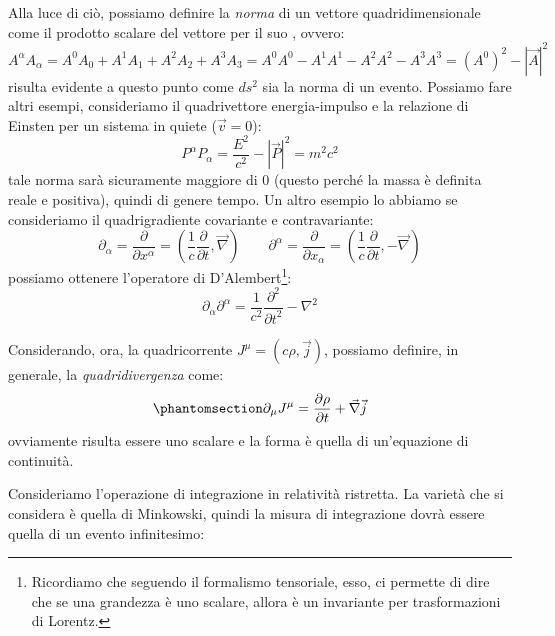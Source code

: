 Alla luce di ciò, possiamo definire la \textit{norma} di un vettore quadridimensionale come il prodotto scalare del vettore per il suo , ovvero:  
\begin{equation*}
A^{\alpha}A_{\alpha}=A^0A_0+A^1A_1+A^2A_2+A^3A_3=A^0A^0-A^1A^1-A^2A^2-A^3A^3=(A^0)^2-|\vec{A}|^2
\end{equation*}
risulta evidente a questo punto come $ds^2$ sia la norma di un evento. Possiamo fare altri esempi, consideriamo il quadrivettore energia-impulso e la relazione di Einsten per un sistema in quiete ($\Vec{v}=0$):
\begin{equation*}
P^{\alpha}P_{\alpha}=\dfrac{E^2}{c^2}-|\vec{P}|^2=m^2c^2
\end{equation*}
tale norma sarà sicuramente maggiore di 0 (questo perché la massa è definita reale e positiva), quindi di genere tempo. Un altro esempio lo abbiamo se consideriamo il quadrigradiente covariante e contravariante:
\begin{equation}
\partial_\alpha=\dfrac{\partial }{\partial x^\alpha}=(\dfrac{1}{c}\dfrac{\partial }{\partial t},\Vec{\nabla}) \qquad \partial^\alpha=\dfrac{\partial }{\partial x_\alpha}=(\dfrac{1}{c}\dfrac{\partial }{\partial t},-\Vec{\nabla})
\end{equation}
possiamo ottenere l'operatore di D'Alembert\footnote{Ricordiamo che seguendo il formalismo tensoriale, esso, ci permette di dire che se una grandezza è uno scalare, allora è un invariante per trasformazioni di Lorentz.}:
\begin{equation}
\partial_\alpha\partial^\alpha=\dfrac{1}{c^2}\dfrac{\partial^2 }{{\partial t}^2}-{\nabla}^2
\end{equation}

Considerando, ora, la quadricorrente $J^\mu=(c\rho,\vec{j})$, possiamo definire, in generale, la \textit{quadridivergenza} come:
\begin{equation} \phantomsection \label{eq:eq_cont}
\partial_\mu J^\mu=\dfrac{\partial\rho }{{\partial t}}+\vec{\nabla}\Vec{j}
\end{equation}
ovviamente risulta essere uno scalare e la forma è quella di un'equazione di continuità.

Consideriamo l'operazione di integrazione in relatività ristretta. La varietà che si considera è quella di Minkowski, quindi la misura di integrazione dovrà essere quella di un evento infinitesimo:

